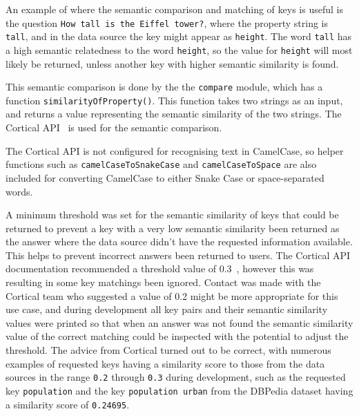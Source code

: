 \documentclass[authoryearcitations]{UoYCSproject}
\begin{document}
An example of where the semantic comparison and matching of keys is useful is the question \texttt{How tall is the Eiffel tower?}, where the property string is \texttt{tall}, and in the data source the key might appear as \texttt{height}. The word \texttt{tall} has a high semantic relatedness to the word \texttt{height}, so the value for \texttt{height} will most likely be returned, unless another key with higher semantic similarity is found.

This semantic comparison is done by the the \texttt{compare} module, which has a function \texttt{similarityOfProperty()}. This function takes two strings as an input, and returns a value representing the semantic similarity of the two strings. The Cortical API~\cite{serviceCorticalSim} is used for the semantic comparison. 

The Cortical API is not configured for recognising text in CamelCase, so helper functions such as \texttt{camelCaseToSnakeCase} and \texttt{camelCaseToSpace} are also included for converting CamelCase to either Snake Case or space-separated words.

A minimum threshold was set for the semantic similarity of keys that could be returned to prevent a key with a very low semantic similarity been returned as the answer where the data source didn't have the requested information available. This helps to prevent incorrect answers been returned to users. The Cortical API documentation recommended a threshold value of 0.3~\cite{Retina-API Documentation}, however this was resulting in some key matchings been ignored. Contact was made with the Cortical team who suggested a value of 0.2 might be more appropriate for this use case, and during development all key pairs and their semantic similarity values were printed so that when an answer was not found the semantic similarity value of the correct matching could be inspected with the potential to adjust the threshold. The advice from Cortical turned out to be correct, with numerous examples of requested keys having a similarity score to those from the data sources in the range \texttt{0.2} through \texttt{0.3} during development, such as the requested key \texttt{population} and the key \texttt{population urban} from the DBPedia dataset having a similarity score of \texttt{0.24695}.
\end{document}
